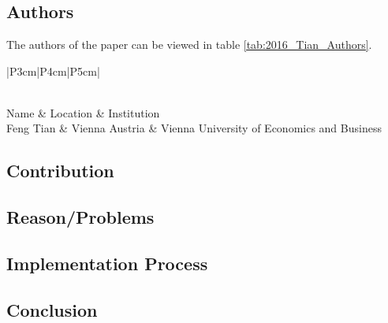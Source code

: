\clearpage
\section*{\citet{2016_Tian}}

\subsection*{Authors}
The authors of the paper can be viewed in table \ref{tab:2016_Tian_Authors}.
\begin{longtable}{ |P{3cm}|P{4cm}|P{5cm}| }
	\caption{Authors} \label{tab:2016_Tian_Authors} \\
	\hline
 	Name & Location & Institution \\ [0.5ex] 
 	\hline\hline
 	\endhead
 	Feng Tian & Vienna Austria  & Vienna University of Economics and Business \\
	 \hline
\end{longtable}


\subsection*{Contribution}



\subsection*{Reason/Problems}



\subsection*{Implementation Process}


\subsection*{Conclusion}


